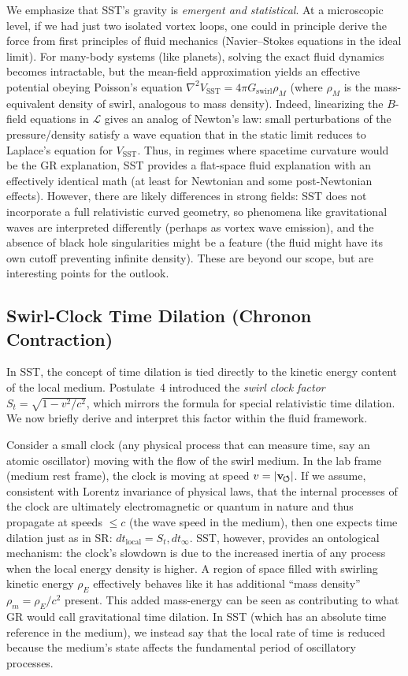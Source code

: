 \documentclass[10pt,reprint,aps,onecolumn,nofootinbib]{revtex4-2}
\newcommand{\swirlarrow}{%
    \mathchoice{\mkern-2mu\scriptstyle\boldsymbol{\circlearrowleft}}%
    {\mkern-2mu\scriptstyle\boldsymbol{\circlearrowleft}}%
    {\mkern-2mu\scriptstyle\boldsymbol{\circlearrowleft}}%
    {\mkern-2mu\scriptscriptstyle\boldsymbol{\circlearrowleft}}%
}
\newcommand{\vswirl}{\mathbf{v}_{\swirlarrow}}
\newcommand{\rhoE}{\rho_{\!E}}                           %
\newcommand{\rhoM}{\rho_{\!m}}     %
\begin{document}
We emphasize that SST’s gravity is \emph{emergent and statistical}. At a microscopic level, if we had just two isolated vortex loops, one could in principle derive the force from first principles of fluid mechanics (Navier–Stokes equations in the ideal limit). For many-body systems (like planets), solving the exact fluid dynamics becomes intractable, but the mean-field approximation yields an effective potential obeying Poisson’s equation $\nabla^2 V_{\text{SST}} = 4\pi G_{\text{swirl}} \rho_M$ (where $\rho_M$ is the mass-equivalent density of swirl, analogous to mass density). Indeed, linearizing the $B$-field equations in $\mathcal{L}$ gives an analog of Newton’s law: small perturbations of the pressure/density satisfy a wave equation that in the static limit reduces to Laplace’s equation for $V_{\text{SST}}$. Thus, in regimes where spacetime curvature would be the GR explanation, SST provides a flat-space fluid explanation with an effectively identical math (at least for Newtonian and some post-Newtonian effects). However, there are likely differences in strong fields: SST does not incorporate a full relativistic curved geometry, so phenomena like gravitational waves are interpreted differently (perhaps as vortex wave emission), and the absence of black hole singularities might be a feature (the fluid might have its own cutoff preventing infinite density). These are beyond our scope, but are interesting points for the outlook.


\subsection{Swirl-Clock Time Dilation (Chronon Contraction)}

In SST, the concept of time dilation is tied directly to the kinetic energy content of the local medium. Postulate~4 introduced the \emph{swirl clock factor} $S_t = \sqrt{1-v^2/c^2}$, which mirrors the formula for special relativistic time dilation. We now briefly derive and interpret this factor within the fluid framework.


Consider a small clock (any physical process that can measure time, say an atomic oscillator) moving with the flow of the swirl medium. In the lab frame (medium rest frame), the clock is moving at speed $v = |\vswirl|$. If we assume, consistent with Lorentz invariance of physical laws, that the internal processes of the clock are ultimately electromagnetic or quantum in nature and thus propagate at speeds $\le c$ (the wave speed in the medium), then one expects time dilation just as in SR: $dt_{\text{local}} = S_t,dt_{\infty}$. SST, however, provides an ontological mechanism: the clock’s slowdown is due to the increased inertia of any process when the local energy density is higher. A region of space filled with swirling kinetic energy $\rhoE$ effectively behaves like it has additional ``mass density'' $\rhoM = \rhoE/c^2$ present. This added mass-energy can be seen as contributing to what GR would call gravitational time dilation. In SST (which has an absolute time reference in the medium), we instead say that the local rate of time is reduced because the medium’s state affects the fundamental period of oscillatory processes.
\end{document}
